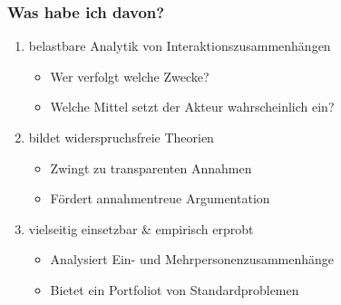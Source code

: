 \documentclass{beamer}
\begin{document}
\begin{frame}
  \frametitle{Was habe ich davon?}
  \begin{enumerate}
    \item belastbare Analytik von Interaktionszusammenhängen
    \begin{itemize}
      \item Wer verfolgt welche Zwecke?
      \item Welche Mittel setzt der Akteur wahrscheinlich ein?
    \end{itemize}
    \item bildet widerspruchsfreie Theorien
    \begin{itemize}
      \item Zwingt zu transparenten Annahmen
      \item Fördert annahmentreue Argumentation
    \end{itemize}
    \item vielseitig einsetzbar \& empirisch erprobt
    \begin{itemize}
      \item Analysiert Ein- und Mehrpersonenzusammenhänge
      \item Bietet ein Portfoliot von Standardproblemen
    \end{itemize}
  \end{enumerate}
\end{frame}
\end{document}
